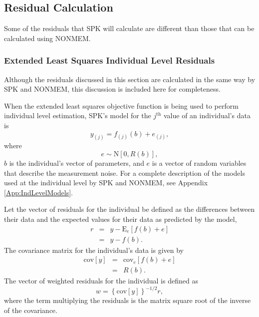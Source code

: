 \documentclass{article}
\begin{document}
\subsection{Residual Calculation}

Some of the residuals that SPK will calculate are different than those
that can be calculated using NONMEM.


\subsubsection{Extended Least Squares Individual Level Residuals}

Although the residuals discussed in this section are calculated in the
same way by SPK and NONMEM, this discussion is included here for
completeness.

When the extended least squares objective function is being used
to perform individual level estimation,
SPK's model for the $j^{\mbox{th}}$ value of an individual's data is
  \begin{equation}
    y_{(j)} = f_{(j)}(b) + e_{(j)} ,
  \end{equation}
where
  \begin{equation}
    e \sim \mbox{N}[ 0, R(b) ] ,
  \end{equation}
$b$ is the individual's vector of parameters, and $e$ is a vector of 
random variables that describe the measurement noise.
For a complete description of the models used at the individual 
level by SPK and NONMEM, see Appendix \ref{App:IndLevelModels}.

Let the vector of residuals for the individual be defined as the
differences between their data and the expected values for their
data as predicted by the model,
  \begin{eqnarray}
    r & = & y - \mbox{E}_{e} 
              \left[ f(b) + e \right] \nonumber \\
      & = & y - f(b) .
  \end{eqnarray}
The covariance matrix for the individual's data is
given by
  \begin{eqnarray}
    \mbox{cov}[y] & = & \mbox{cov}_{e}
          \left[ f(b) + e \right] \nonumber \\
        & = & R(b) .
  \end{eqnarray}
The vector of weighted residuals for the individual is
defined as 
  \begin{equation}
    w = \left\{ \mbox{cov}[y] \right\}^{-1/2} r,
  \end{equation}
where the term multiplying the residuals is the matrix square 
root of the inverse of the covariance.
\end{document}
